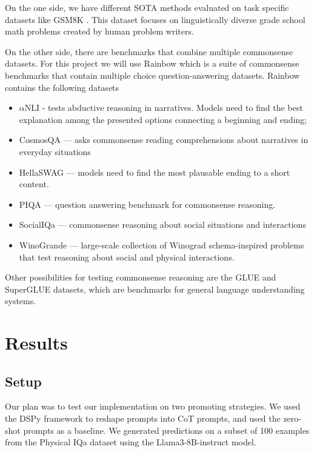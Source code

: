 \documentclass[fleqn,moreauthors,10pt]{ds_report}
\begin{document}
On the one side, we have different SOTA methods \cite{CoT} evaluated on task specific datasets like GSM8K \cite{GSMK8}. This dataset focuses on linguistically diverse grade school math problems created by human problem writers.

On the other side, there are benchmarks that combine multiple commonsense datasets. For this project we will use Rainbow which is a suite of commonsense benchmarks that contain multiple choice question-answering datasets.
Rainbow contains the following datasets

\begin{itemize}
    \item $\alpha$NLI \cite{alphaNLI} - tests abductive reasoning in narratives. Models need to find the best explanation among the presented options connecting a beginning and ending;
    \item  CosmosQA \cite{Tian2020} — asks commonsense reading comprehensions about narratives in everyday situations
    \item HellaSWAG \cite{Zellers2020} — models need to find the most plausable ending to a short content.
    \item PIQA \cite{Bisk2020} — question answering benchmark for commonsense reasoning.
    \item SocialIQa \cite{socialIQA} — commonsense reasoning about social situations and interactions
    \item WinoGrande \cite{WinoGRANDE} — large-scale collection of Winograd schema-inspired problems that test reasoning about social and physical interactions.
\end{itemize}

Other possibilities for testing commonsense reasoning are the GLUE \cite{GLUE} and SuperGLUE \cite{supeglue} datasets, which are benchmarks for general language understanding systems.

\section{Results}

\subsection{Setup}
Our plan was to test our implementation on two promoting strategies. We used the DSPy framework \cite{dspy} to reshape prompts into CoT prompts,  and used the zero-shot prompts as a baseline. We generated predictions on a subset of 100 examples from the Physical IQa dataset using the Llama3-8B-instruct model.
\end{document}
